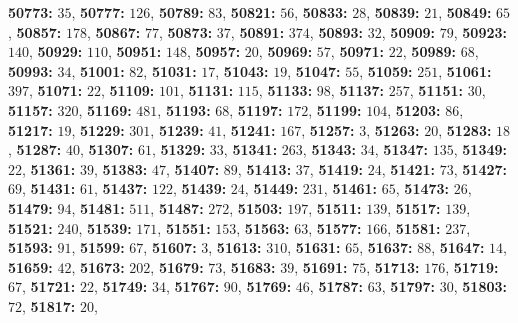 \textsf{\bfseries 50773:} $35$, \textsf{\bfseries 50777:} $126$, \textsf{\bfseries 50789:} $83$, \textsf{\bfseries 50821:} $56$, \textsf{\bfseries 50833:} $28$, \textsf{\bfseries 50839:} $21$, \textsf{\bfseries 50849:} $65$, \textsf{\bfseries 50857:} $178$, \textsf{\bfseries 50867:} $77$, \textsf{\bfseries 50873:} $37$, \textsf{\bfseries 50891:} $374$, \textsf{\bfseries 50893:} $32$, \textsf{\bfseries 50909:} $79$, \textsf{\bfseries 50923:} $140$, \textsf{\bfseries 50929:} $110$, \textsf{\bfseries 50951:} $148$, \textsf{\bfseries 50957:} $20$, \textsf{\bfseries 50969:} $57$, \textsf{\bfseries 50971:} $22$, \textsf{\bfseries 50989:} $68$, \textsf{\bfseries 50993:} $34$, \textsf{\bfseries 51001:} $82$, \textsf{\bfseries 51031:} $17$, \textsf{\bfseries 51043:} $19$, \textsf{\bfseries 51047:} $55$, \textsf{\bfseries 51059:} $251$, \textsf{\bfseries 51061:} $397$, \textsf{\bfseries 51071:} $22$, \textsf{\bfseries 51109:} $101$, \textsf{\bfseries 51131:} $115$, \textsf{\bfseries 51133:} $98$, \textsf{\bfseries 51137:} $257$, \textsf{\bfseries 51151:} $30$, \textsf{\bfseries 51157:} $320$, \textsf{\bfseries 51169:} $481$, \textsf{\bfseries 51193:} $68$, \textsf{\bfseries 51197:} $172$, \textsf{\bfseries 51199:} $104$, \textsf{\bfseries 51203:} $86$, \textsf{\bfseries 51217:} $19$, \textsf{\bfseries 51229:} $301$, \textsf{\bfseries 51239:} $41$, \textsf{\bfseries 51241:} $167$, \textsf{\bfseries 51257:} $3$, \textsf{\bfseries 51263:} $20$, \textsf{\bfseries 51283:} $18$, \textsf{\bfseries 51287:} $40$, \textsf{\bfseries 51307:} $61$, \textsf{\bfseries 51329:} $33$, \textsf{\bfseries 51341:} $263$, \textsf{\bfseries 51343:} $34$, \textsf{\bfseries 51347:} $135$, \textsf{\bfseries 51349:} $22$, \textsf{\bfseries 51361:} $39$, \textsf{\bfseries 51383:} $47$, \textsf{\bfseries 51407:} $89$, \textsf{\bfseries 51413:} $37$, \textsf{\bfseries 51419:} $24$, \textsf{\bfseries 51421:} $73$, \textsf{\bfseries 51427:} $69$, \textsf{\bfseries 51431:} $61$, \textsf{\bfseries 51437:} $122$, \textsf{\bfseries 51439:} $24$, \textsf{\bfseries 51449:} $231$, \textsf{\bfseries 51461:} $65$, \textsf{\bfseries 51473:} $26$, \textsf{\bfseries 51479:} $94$, \textsf{\bfseries 51481:} $511$, \textsf{\bfseries 51487:} $272$, \textsf{\bfseries 51503:} $197$, \textsf{\bfseries 51511:} $139$, \textsf{\bfseries 51517:} $139$, \textsf{\bfseries 51521:} $240$, \textsf{\bfseries 51539:} $171$, \textsf{\bfseries 51551:} $153$, \textsf{\bfseries 51563:} $63$, \textsf{\bfseries 51577:} $166$, \textsf{\bfseries 51581:} $237$, \textsf{\bfseries 51593:} $91$, \textsf{\bfseries 51599:} $67$, \textsf{\bfseries 51607:} $3$, \textsf{\bfseries 51613:} $310$, \textsf{\bfseries 51631:} $65$, \textsf{\bfseries 51637:} $88$, \textsf{\bfseries 51647:} $14$, \textsf{\bfseries 51659:} $42$, \textsf{\bfseries 51673:} $202$, \textsf{\bfseries 51679:} $73$, \textsf{\bfseries 51683:} $39$, \textsf{\bfseries 51691:} $75$, \textsf{\bfseries 51713:} $176$, \textsf{\bfseries 51719:} $67$, \textsf{\bfseries 51721:} $22$, \textsf{\bfseries 51749:} $34$, \textsf{\bfseries 51767:} $90$, \textsf{\bfseries 51769:} $46$, \textsf{\bfseries 51787:} $63$, \textsf{\bfseries 51797:} $30$, \textsf{\bfseries 51803:} $72$, \textsf{\bfseries 51817:} $20$, 
